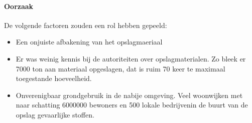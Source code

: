 \documentclass{article}
\begin{document}
	
	\paragraph{Oorzaak}
	
	De volgende factoren zouden een rol hebben gepeeld:
	\begin{itemize}
		\item Een onjuiste afbakening van het opslagmaeriaal
		\item Er was  weinig kennis bij de autoriteiten over  opslagmaterialen. Zo bleek er 7000 ton aan materiaal opgeslagen, dat is ruim 70 keer te maximaal toegestande hoeveelheid. 
		\item Onverenigbaar grondgebruik in de nabije omgeving. Veel woonwijken met naar schatting 6000000 bewoners en 500 lokale bedrijvenin de buurt van de opslag gevaarlijke stoffen.
	\end{itemize}
	
\end{document}
